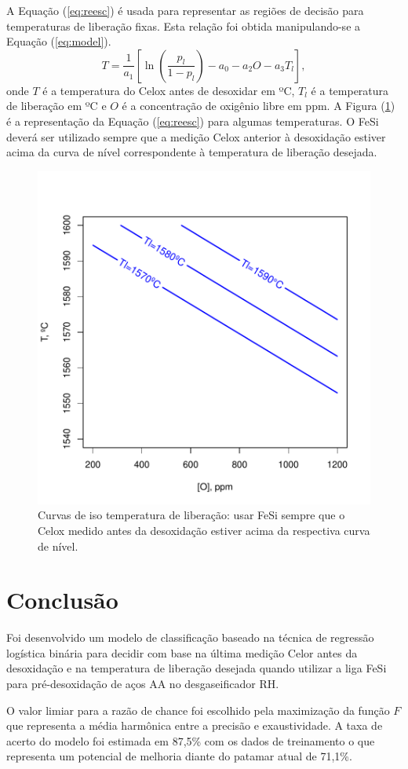 	A Equação (\ref{eq:reesc}) é usada para representar as regiões de decisão para temperaturas de liberação fixas. Esta relação foi obtida manipulando-se a Equação (\ref{eq:model}).
	\begin{equation}
		\label{eq:reesc}
		T = \frac{1}{a_1} \left[ \ln \left( \frac{p_l}{1-p_l} \right) - a_0 - a_2 O - a_3 T_l \right],
	\end{equation}
	\noindent onde $T$ é a temperatura do Celox antes de desoxidar em ºC, $T_l$ é a temperatura de liberação em ºC e $O$ é a concentração de oxigênio libre em ppm. A Figura (\ref{fig:level}) é a representação da Equação (\ref{eq:reesc}) para algumas temperaturas. O FeSi deverá ser utilizado sempre que a medição Celox anterior à desoxidação estiver acima da curva de nível correspondente à temperatura de liberação desejada.
	\begin{figure}[H]
		\centering
		\includegraphics[scale=0.55, bb=0 0 432 432, trim=0in 20pt 0in 40pt]{figures/fig05.pdf}
		\caption{Curvas de iso temperatura de liberação: usar FeSi sempre que o Celox medido antes da desoxidação estiver acima da respectiva curva de nível.}
		\label{fig:level}
	\end{figure}	
\section{Conclusão}
	Foi desenvolvido um modelo de classificação baseado na técnica de regressão logística binária para decidir com base na última medição Celor antes da desoxidação e na temperatura de liberação desejada quando utilizar a liga FeSi para pré-desoxidação de aços AA no desgaseificador RH.
	
	O valor limiar para a razão de chance foi escolhido pela maximização da função $F$ que representa a média harmônica entre a precisão e exaustividade\cite{wiki:pr}. A taxa de acerto do modelo foi estimada em 87,5\% com os dados de treinamento o que representa um potencial de melhoria diante do patamar atual de 71,1\%.